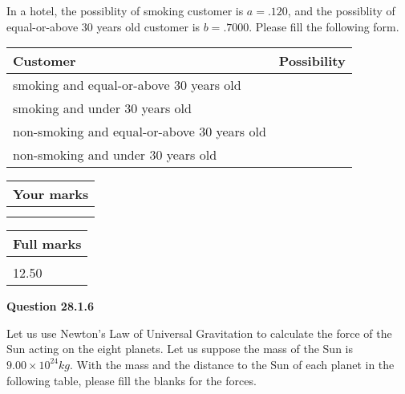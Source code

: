 \documentclass[12pt]{article}
\begin{document}
  
In a hotel, the possiblity of  %
smoking customer is
$a =  %
.120$, and the possiblity of  %
equal-or-above 30 years old customer is $ b =  %
.7000$.
Please fill the following form.
 
\noindent
\begin{tabular}{|l|l|}
\hline
Customer & Possibility \\
\hline
smoking  and   %
equal-or-above 30 years old  & \\
\hline
smoking  and   %
under 30 years old & \\
\hline
 non-smoking and   %
equal-or-above 30 years old  & \\
\hline
 non-smoking and  %
under 30 years old & \\
\hline
\end{tabular}
 
 
 

 

 
\vspace{0.3in}
  
\vspace{0.2in}
  
         \begin{tabular}{|l|}
\hline
 Your marks  \\
\hline
 \\ 
 \\ 
\hline
\end{tabular}
\hspace{0.05in} \begin{tabular}{|l|}
\hline
 Full marks  \\
\hline
 \\ 
12.50 \\
\hline
\end{tabular}
{\textbf{\Large{Question
28.1.6 
}}}
  
  
Let us use Newton's Law of Universal Gravitation to calculate the force
of the Sun acting on the eight planets. Let us suppose the mass of the
Sun is $ %
9.00 \times 10^{24} kg$. With the mass and the
distance to the Sun of each planet in the following table, please fill
the blanks for the forces.
 
\vspace{0.2in}
 
\end{document}

